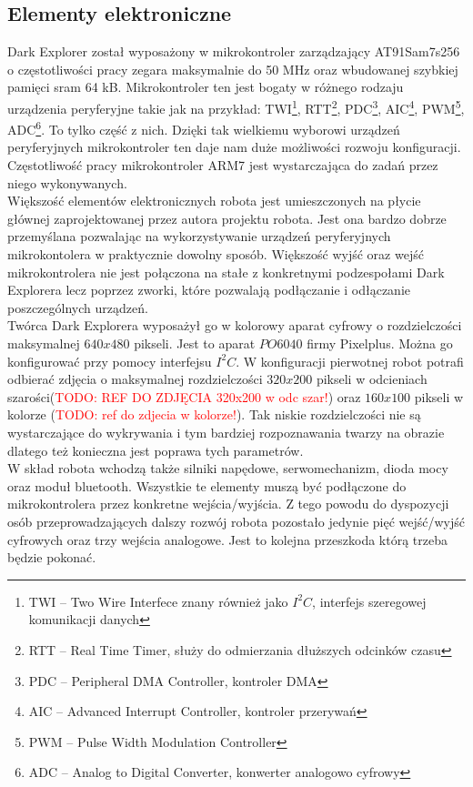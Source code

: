 \subsection{Elementy elektroniczne}
Dark Explorer został wyposażony w mikrokontroler zarządzający AT91Sam7s256 o częstotliwości pracy zegara maksymalnie do 50 MHz oraz wbudowanej szybkiej pamięci sram 64 kB. Mikrokontroler ten jest bogaty w różnego rodzaju urządzenia peryferyjne takie jak na przykład: TWI\footnote{TWI -- Two Wire Interfece znany również jako $I^{2}C$, interfejs szeregowej komunikacji danych}, RTT\footnote{RTT -- Real Time Timer, służy do odmierzania dłuższych odcinków czasu}, PDC\footnote{PDC -- Peripheral DMA Controller, kontroler DMA}, AIC\footnote{AIC -- Advanced Interrupt Controller, kontroler przerywań}, PWM\footnote{PWM -- Pulse Width Modulation Controller}, ADC\footnote{ADC -- Analog to Digital Converter, konwerter analogowo cyfrowy}. To tylko część z nich. Dzięki tak wielkiemu wyborowi urządzeń peryferyjnych mikrokontroler ten daje nam duże możliwości rozwoju konfiguracji. Częstotliwość pracy mikrokontroler ARM7 jest wystarczająca do zadań przez niego wykonywanych.
\\

Większość elementów elektronicznych robota jest umieszczonych na płycie głównej zaprojektowanej przez autora projektu robota. Jest ona bardzo dobrze przemyślana pozwalając na wykorzystywanie urządzeń peryferyjnych mikrokontolera w praktycznie dowolny sposób. Większość wyjść oraz wejść mikrokontrolera nie jest połączona na stałe z konkretnymi podzespołami Dark Explorera lecz poprzez zworki, które pozwalają podłączanie i odłączanie poszczególnych urządzeń.
\\

Twórca Dark Explorera wyposażył go w kolorowy aparat cyfrowy o rozdzielczości maksymalnej $640x480$ pikseli. Jest to aparat $PO6040$ firmy Pixelplus. Można go konfigurować przy pomocy interfejsu $I^{2}C$. W konfiguracji pierwotnej robot potrafi odbierać zdjęcia o maksymalnej rozdzielczości $320x200$ pikseli w odcieniach szarości(\textcolor{red}{TODO: REF DO ZDJĘCIA 320x200 w odc szar!}) oraz $160x100$ pikseli w kolorze (\textcolor{red}{TODO: ref do zdjecia w kolorze!}). Tak niskie rozdzielczości nie są wystarczające do wykrywania i tym bardziej rozpoznawania twarzy na obrazie dlatego też konieczna jest poprawa tych parametrów.
\\

W skład robota wchodzą także silniki napędowe, serwomechanizm, dioda mocy oraz moduł bluetooth. Wszystkie te elementy muszą być podłączone do mikrokontrolera przez konkretne wejścia/wyjścia. Z tego powodu do dyspozycji osób przeprowadzających dalszy rozwój robota pozostało jedynie pięć wejść/wyjść cyfrowych oraz trzy wejścia analogowe. Jest to kolejna przeszkoda którą trzeba będzie pokonać.
\\

